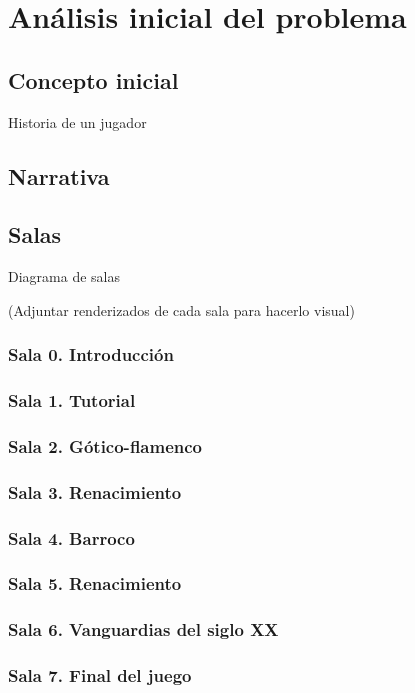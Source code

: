 \chapter{Análisis inicial del problema}
\label{chap:analisis_problema}

\section{Concepto inicial}

Historia de un jugador

\section{Narrativa}

\section{Salas}

Diagrama de salas

(Adjuntar renderizados de cada sala para hacerlo visual)

\subsection{Sala 0. Introducción}

\subsection{Sala 1. Tutorial}

\subsection{Sala 2. Gótico-flamenco}

\subsection{Sala 3. Renacimiento}

\subsection{Sala 4. Barroco}

\subsection{Sala 5. Renacimiento}

\subsection{Sala 6. Vanguardias del siglo XX}

\subsection{Sala 7. Final del juego}


